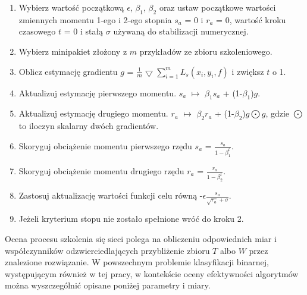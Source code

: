 \begin{enumerate}
	\item Wybierz wartość początkową $\epsilon$, $\beta_1$, $\beta_2$ oraz ustaw początkowe wartości zmiennych momentu 1-ego i 2-ego stopnia $s_a$ = 0 i $r_a$ = 0, wartość kroku czasowego $t$ = 0 i stałą $\sigma$ używaną do stabilizacji numerycznej.
	\item Wybierz minipakiet złożony z $m$ przykładów ze zbioru szkoleniowego.
	\item Oblicz estymację gradientu $g$ = $\frac{1}{m}\bigtriangledown \sum_{i=1}^{m}L_s(x_i, y_i, f)$ i zwiększ $t$ o 1.
	\item Aktualizuj estymację pierwszego momentu. $s_a$ $\mapsto$ $\beta_1$$s_a$ + (1-$\beta_1$)$g$.
	\item Aktualizuj estymację drugiego momentu. $r_a$ $\mapsto$ $\beta_2$$r_a$ + (1-$\beta_2$)$g\bigodot g$, gdzie $\bigodot$ to iloczyn skalarny dwóch gradientów.
	\item Skoryguj obciążenie momentu pierwszego rzędu $s_a$ = $\frac{s_a}{1-\beta_1^t}$.
	\item Skoryguj obciążenie momentu drugiego rzędu $r_a$ = $\frac{r_a}{1-\beta_2^t}$.
	\item Zastosuj aktualizację wartości funkcji celu równą -$\epsilon$$\frac{s_a}{\sqrt{r_a}+\sigma}$.
	\item Jeżeli kryterium stopu nie zostało spełnione wróć do kroku 2. 
\end{enumerate}

Ocena procesu szkolenia się sieci polega na obliczeniu odpowiednich miar i współczynników odzwierciedlających przybliżenie zbioru $T$ albo $W$ przez znalezione rozwiązanie. W powszechnym problemie klasyfikacji binarnej, występującym również \linebreak w tej pracy, w kontekście oceny efektywności algorytmów można wyszczególnić opisane poniżej parametry i miary.

